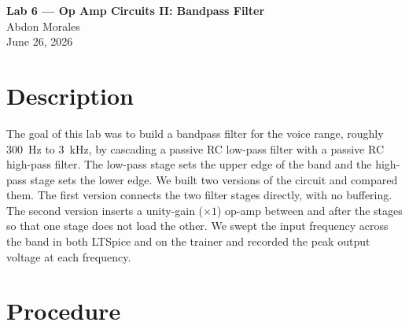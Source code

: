 \documentclass[11pt]{article}
\begin{document}
\begin{center}
    {\LARGE\bfseries Lab 6 --- Op Amp Circuits II: Bandpass Filter}\\[0.8em]
    {\large Abdon Morales}\\[0.3em]
    {\large June 26, 2026}
\end{center}
\vspace{1em}

\section*{Description}

The goal of this lab was to build a bandpass filter for the voice range, roughly
\SI{300}{\hertz} to \SI{3}{\kilo\hertz}, by cascading a passive RC low-pass filter
with a passive RC high-pass filter. The low-pass stage sets the upper edge of the
band and the high-pass stage sets the lower edge. We built two versions of the
circuit and compared them. The first version connects the two filter stages
directly, with no buffering. The second version inserts a unity-gain (\(\times 1\))
op-amp between and after the stages so that one stage does not load the other. We
swept the input frequency across the band in both LTSpice and on the trainer and
recorded the peak output voltage at each frequency.

\section*{Procedure}
\end{document}

